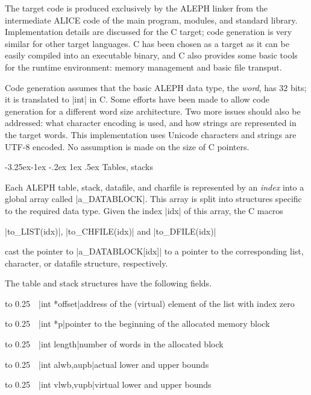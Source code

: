 \documentclass[titlepage]{article}
\makeatletter
\newcommand\A{\textsf{ALEPH}}
\newcommand\I{\textsf{ALICE}}
\newcommand\g[1]{\textsf{\color{blue!90!black}#1}}
\renewcommand\subsection{%
\@startsection{subsection}{2}{\z@}%
   {-3.25ex\@plus -1ex \@minus -.2ex}%
   {1ex \@plus .5ex}%
   {\normalfont\normalsize\bfseries}}
\makeatother
\begin{document}
The target code is produced exclusively by the \A{} linker from the
intermediate \I{} code of the main program, modules, and standard
library. Implementation details are discussed for the {\sf C} target; code generation is very similar for other target
languages. {\sf C} has been chosen as a target as it can be easily
compiled into an executable
binary, and {\sf C} also provides some basic tools for the runtime
environment: memory management and basic file transput.

Code generation assumes that the basic \A{} data type, the \emph{word}, has
32 bits; it is translated to \pp|int| in {\sf C}. Some efforts have been
made to allow code generation for a different word size architecture.
Two more issues should also be addressed: what character
encoding is used, and how strings are represented in the target words. 
This implementation uses Unicode characters and strings are UTF-8 encoded.
No assumption is made on the size of {\sf C} pointers.

\subsection{Tables, stacks}\label{subsec:tables-stacks}

Each \A{} \g{table}, \g{stack}, \g{datafile}, and \g{charfile} is represented
by an \emph{index} into a global array called \pp|a\_DATABLOCK|. This array is
split into structures specific to the required data type. Given the index
\pp|idx| of this array, the {\sf C} macros

\noindent\bgroup\hfil
\pp|to\_LIST(idx)|, \pp|to\_CHFILE(idx)| and \pp|to\_DFILE(idx)|
\egroup\par\noindent
cast the pointer to
\pp|a\_DATABLOCK[idx]| to a pointer to the corresponding list, character, or
datafile structure, respectively.

The \g{table} and \g{stack} structures have the following fields.
\def\HH{\noindent\hbox to 0.25\linewidth\bgroup~~}

\medskip

\HH\pp|int *offset|\HE address of the (virtual) element of the list with index zero

\HH\pp|int *p|\HE  pointer to the beginning of the allocated memory block

\HH\pp|int length|\HE number of words in the allocated block

\HH\pp|int alwb,aupb|\HE actual lower and upper bounds

\HH\pp|int vlwb,vupb|\HE virtual lower and upper bounds
\end{document}
